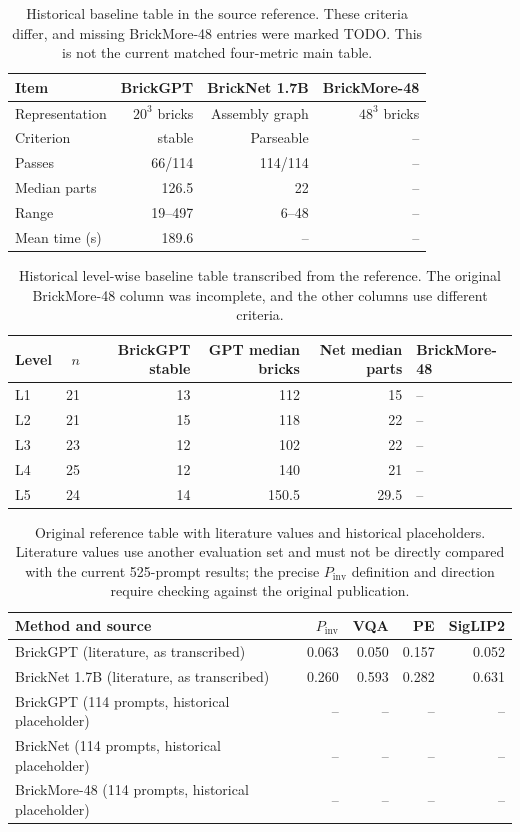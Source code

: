 \begin{table}[!htbp]\centering\small
\begin{tabular}{lrrr}\toprule
Item & BrickGPT & BrickNet 1.7B & BrickMore-48 \\ \midrule
Representation & $20^3$ bricks & Assembly graph & $48^3$ bricks \\
Criterion & stable & Parseable & -- \\
Passes & 66/114 & 114/114 & -- \\
Median parts & 126.5 & 22 & -- \\
Range & 19--497 & 6--48 & -- \\
Mean time (s) & 189.6 & -- & -- \\
\bottomrule\end{tabular}
\caption{Historical baseline table in the source reference. These criteria differ, and missing BrickMore-48 entries were marked TODO. This is not the current matched four-metric main table.}
\end{table}

\begin{table}[!htbp]\centering\small
\begin{tabular}{lrrrrl}\toprule
Level & $n$ & BrickGPT stable & GPT median bricks & Net median parts & BrickMore-48 \\ \midrule
L1 & 21 & 13 & 112 & 15 & -- \\
L2 & 21 & 15 & 118 & 22 & -- \\
L3 & 23 & 12 & 102 & 22 & -- \\
L4 & 25 & 12 & 140 & 21 & -- \\
L5 & 24 & 14 & 150.5 & 29.5 & -- \\
\bottomrule\end{tabular}
\caption{Historical level-wise baseline table transcribed from the reference. The original BrickMore-48 column was incomplete, and the other columns use different criteria.}
\end{table}

\begin{table}[!htbp]\centering\small
\begin{tabular}{lrrrr}\toprule
Method and source & $P_{\mathrm{inv}}$ & VQA & PE & SigLIP2 \\ \midrule
BrickGPT (literature, as transcribed) & 0.063 & 0.050 & 0.157 & 0.052 \\
BrickNet 1.7B (literature, as transcribed) & 0.260 & 0.593 & 0.282 & 0.631 \\
BrickGPT (114 prompts, historical placeholder) & -- & -- & -- & -- \\
BrickNet (114 prompts, historical placeholder) & -- & -- & -- & -- \\
BrickMore-48 (114 prompts, historical placeholder) & -- & -- & -- & -- \\
\bottomrule\end{tabular}
\caption{Original reference table with literature values and historical placeholders. Literature values use another evaluation set and must not be directly compared with the current 525-prompt results; the precise $P_{\mathrm{inv}}$ definition and direction require checking against the original publication.}
\end{table}


